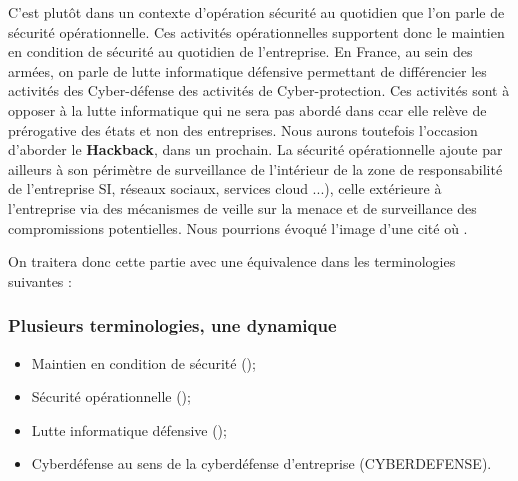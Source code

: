 C’est plutôt dans un contexte d'opération sécurité au quotidien que l’on parle de sécurité opérationnelle. Ces activités opérationnelles supportent donc le maintien en condition de sécurité au quotidien de l’entreprise. En France, au sein des armées, on parle de lutte informatique défensive permettant de différencier les activités des Cyber-défense des activités de Cyber-protection. Ces activités sont à opposer à la lutte informatique qui ne sera pas abordé dans c\ecours car elle relève de prérogative des états et non des entreprises. Nous aurons toutefois l'occasion d'aborder le \textbf{Hackback}, dans un prochain.
La sécurité opérationnelle ajoute par ailleurs à son périmètre de surveillance de l'intérieur de la zone de responsabilité de l'entreprise SI, réseaux sociaux, services cloud ...), celle extérieure à l'entreprise via des mécanismes de veille sur la menace et de surveillance des compromissions potentielles. Nous pourrions évoqué l'image d'une cité où .

On traitera donc cette partie avec une équivalence dans les terminologies suivantes :

\begin{frame}
\frametitle<presentation>{Plusieurs terminologies, une dynamique}
	\begin{itemize}
		\item Maintien en condition de sécurité (); 
		\item Sécurité opérationnelle ();
		\item Lutte informatique défensive ();
		\item Cyberdéfense au sens de la cyberdéfense d'entreprise (CYBERDEFENSE).
	\end{itemize}
\end{frame}

